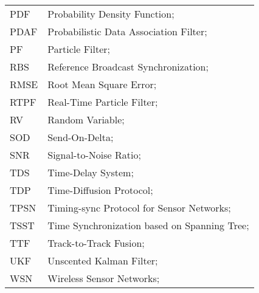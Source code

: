 \begin{longtable}{ll}
	PDF         & Probability Density Function; \\
	PDAF		& Probabilistic Data Association Filter; \\
	PF 			& Particle Filter; \\
	RBS			& Reference Broadcast Synchronization; \\
	RMSE		& Root Mean Square Error; \\
	RTPF		& Real-Time Particle Filter; \\
	RV			& Random Variable; \\
	SOD			& Send-On-Delta; \\
	SNR			& Signal-to-Noise Ratio; \\
	TDS			& Time-Delay System; \\
	TDP			& Time-Diffusion Protocol; \\
	TPSN		& Timing-sync Protocol for Sensor Networks; \\
	TSST		& Time Synchronization based on Spanning Tree; \\
	TTF 		& Track-to-Track Fusion; \\
	UKF			& Unscented Kalman Filter; \\
	WSN			& Wireless Sensor Networks; \\
\end{longtable}

